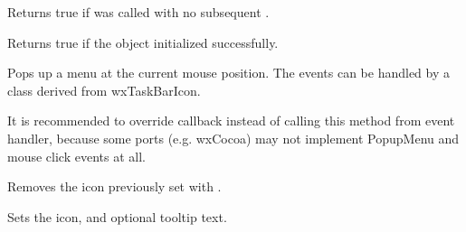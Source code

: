 
Returns true if  was called with no subsequent .

\label{wxtaskbariconisok}


Returns true if the object initialized successfully.

\label{wxtaskbariconpopupmenu}


Pops up a menu at the current mouse position. The events can be handled by
a class derived from wxTaskBarIcon.


It is recommended to override
callback instead of calling this method from event handler, because some
ports (e.g. wxCocoa) may not implement PopupMenu and mouse click events at all.

\label{wxtaskbariconremoveicon}


Removes the icon previously set with .

\label{wxtaskbariconseticon}


Sets the icon, and optional tooltip text.


